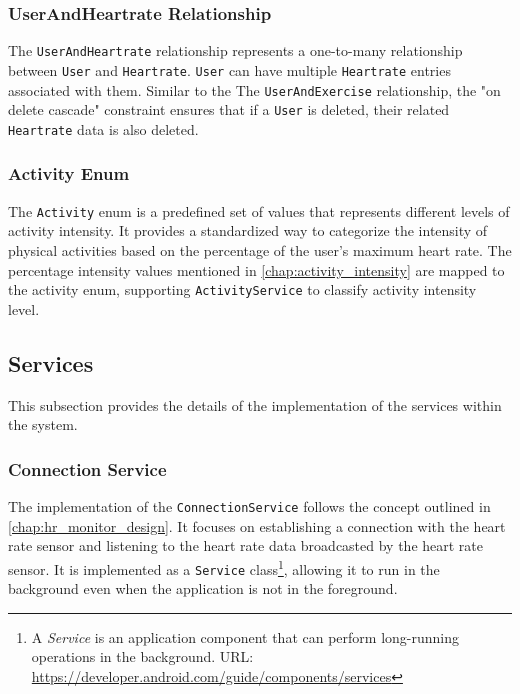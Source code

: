 \subsubsection{UserAndHeartrate Relationship}
The \verb;UserAndHeartrate; relationship represents a one-to-many relationship between \verb;User; and \verb;Heartrate;. 
\verb;User; can have multiple \verb;Heartrate; entries associated with them. Similar to the The \verb;UserAndExercise; relationship, the "on delete cascade" constraint ensures that if a \verb;User; is deleted, their related \verb;Heartrate; data is also deleted.

\subsubsection{Activity Enum}
The \verb;Activity; enum is a predefined set of values that represents different levels of activity intensity. 
It provides a standardized way to categorize the intensity of physical activities based on the percentage of the user's maximum heart rate. 
The percentage intensity values mentioned in \autoref{chap:activity_intensity} are mapped to the activity enum, supporting \verb;ActivityService; to classify activity intensity level.


\subsection{Services}
This subsection provides the details of the implementation of the services within the system.

\subsubsection{Connection Service}
The implementation of the \verb;ConnectionService; follows the concept outlined in \autoref{chap:hr_monitor_design}. It focuses on establishing a connection with the heart rate sensor and listening to the heart rate data broadcasted by the heart rate sensor. 
It is implemented as a \verb;Service; class\footnote{A \emph{Service} is an application component that can perform long-running operations in the background. URL: \url{https://developer.android.com/guide/components/services}}, allowing it to run in the background even when the application is not in the foreground.

